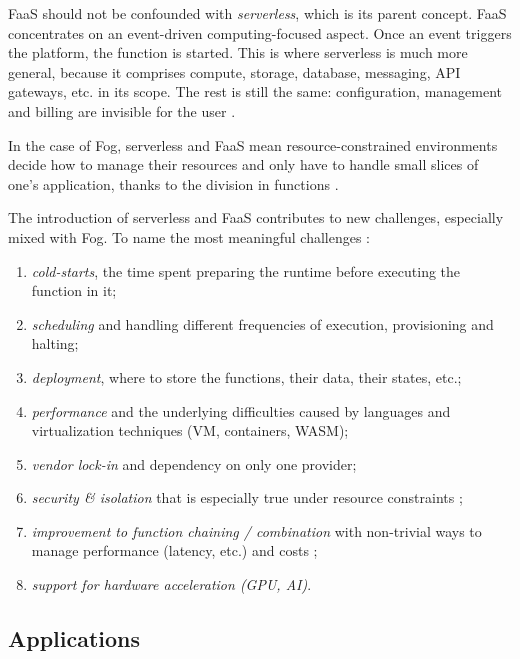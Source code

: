 \documentclass[11pt]{sdm}
\begin{document}
\gls{FaaS} should not be confounded with \emph{serverless}, which is its parent concept. \gls{FaaS} concentrates on an event-driven computing-focused aspect. Once an event triggers the platform, the function is started. This is where serverless is much more general, because it comprises compute, storage, database, messaging, API gateways, etc. in its scope. The rest is still the same: configuration, management and billing are invisible for the user \cite{ibm_faas_2019}.

In the case of Fog, serverless and \gls{FaaS} mean resource-constrained environments decide how to manage their resources and only have to handle small slices of one's application, thanks to the division in functions \cite{bermbach_auctionwhisk_2021}.

The introduction of serverless and \gls{FaaS} contributes to new challenges, especially mixed with Fog. To name the most meaningful challenges \cite{kjorveziroski_iot_2021}:
\begin{enumerate}
	\item \emph{cold-starts}, the time spent preparing the runtime before executing the function in it;
	\item \emph{scheduling} and handling different frequencies of execution, provisioning and halting;
	\item \emph{deployment}, where to store the functions, their data, their states, etc.;
	\item \emph{performance} and the underlying difficulties caused by languages and virtualization techniques (\gls{VM}, containers, WASM);
	\item \emph{vendor lock-in} and dependency on only one provider;
	\item \emph{security \& isolation} that is especially true under resource constraints \cite{maurice_hello_2017};
	\item \emph{improvement to function chaining / combination} with non-trivial ways to manage performance (latency, etc.) and costs \cite{elgamal_costless_2018};
	\item \emph{support for hardware acceleration (\gls{GPU}, \gls{AI})}.
\end{enumerate}

\subsection {Applications}
\end{document}
